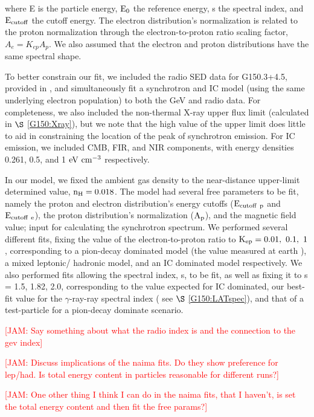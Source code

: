 \documentclass[iop]{emulateapj}
\newcommand{\kibitz}[2]{\ifnum\Comments=1\textcolor{#1}{#2}\fi}
\newcommand{\jamie}[1]{\kibitz{red}      {[JAM: #1]}}
\newcommand{\gam}{$\gamma$-ray}
\newcommand{\Gone}{G150.3+4.5}
\begin{document}
where E is the particle energy, ${\rm E_0}$ the reference energy, s the spectral index, and ${\rm E_{cutoff}}$ the cutoff energy. The electron distribution's normalization is related to the proton normalization through the electron-to-proton ratio scaling factor, $A_e = K_{ep} A_p$. We also assumed that the electron and proton distributions have the same spectral shape. 

To better constrain our fit, we included the radio SED data for \Gone{}, provided in \cite{Gerbrandt14}, and simultaneously fit a  synchrotron and IC model (using the same underlying electron population) to both the GeV and radio data. For completeness, we also included the non-thermal X-ray upper flux limit (calculated  in $\S$ \ref{G150:Xray}), but we note that the high value of the upper limit does little to aid in constraining the location of the peak of synchrotron emission. For IC emission, we included CMB, FIR, and NIR components, with energy densities 0.261, 0.5, and 1 ${\rm eV~cm^{-3}}$ respectively. 

In our model, we fixed the ambient gas density to the near-distance upper-limit determined value, ${\rm n_{H} = 0.018}$. The model had several free parameters to be fit, namely the proton and electron distribution's energy cutoffs (${\rm E_{cutoff~p}}$ and ${\rm E_{cutoff~e}}$), the proton distribution's normalization (${\rm A_p}$), and the magnetic field value; input for calculating the synchrotron spectrum. We performed several different fits, fixing the value of the electron-to-proton ratio to ${\rm K_{ep} = 0.01,~0.1,~1}$, corresponding to a pion-decay dominated model (the value measured at earth \citep{Hillas05}), a mixed leptonic/ hadronic model, and an IC dominated model  respectively. We also performed fits allowing the spectral index, s, to be fit, as well as fixing it to s = 1.5, 1.82, 2.0, corresponding to the value expected for IC dominated, our best-fit value for the \gam{}-ray spectral index ( see $\S$ \ref{G150:LATspec}), and that of a test-particle for a pion-decay dominate scenario.




\jamie{Say something about what the radio index is and the connection to the gev index}

\jamie{Discuss implications of the naima fits. Do they show preference for lep/had. Is total energy content in particles reasonable for different runs?}

\jamie{One other thing I think I can do in the naima fits, that I haven't, is set the total energy content and then fit the free params?}
\end{document}
